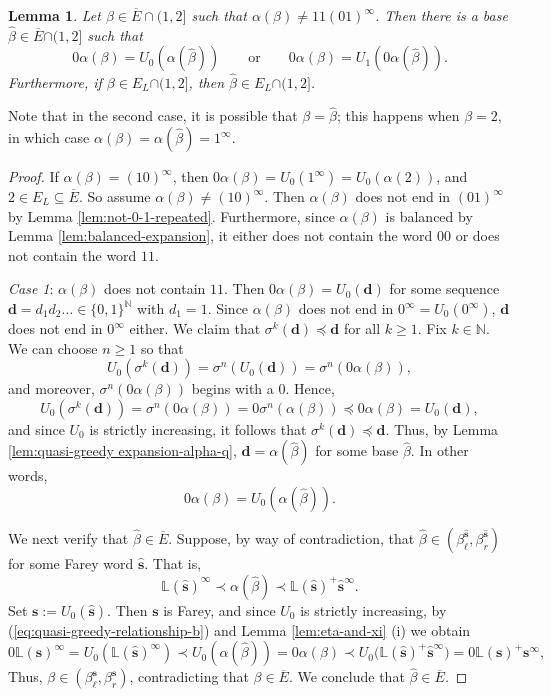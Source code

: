 \documentclass[11pt]{amsart}
\newtheorem{lemma}[theorem]{Lemma}
\theoremstyle{definition}
\theoremstyle{remark}
\numberwithin{equation}{section}
\newcommand{\N}{\ensuremath{\mathbb{N}}}
\renewcommand{\L}{\ensuremath{\mathbb{L}}}
\newcommand{\s}{ {\mathbf{s}}}
\newcommand{\f}{\infty}
\newcommand{\al}{\alpha}
\newcommand{\lle}{\preccurlyeq}
\newcommand{\si}{\sigma}
\begin{document}
\begin{lemma} \label{lem:alpha-renormalizing}
{
Let $\beta\in \overline{E}\cap(1,2]$ such that $\al(\beta)\neq 11(01)^\f$. Then there is a base $\hat{\beta}\in \overline{E}{\cap(1,2]}$ such that
\[
0\al(\beta)=U_0(\al(\hat{\beta})) \qquad \mbox{or} \qquad 0\al(\beta)=U_1(0\al(\hat{\beta})).
\]
Furthermore, if $\beta\in E_L{\cap(1,2]}$, then $\hat{\beta}\in E_L{\cap(1,2]}$.
}
\end{lemma}

Note that in the second case, it is possible that $\beta=\hat{\beta}$; this happens when $\beta=2$, in which case $\al(\beta)=\al(\hat{\beta})=1^\f$.

\begin{proof}
If $\al(\beta)=(10)^\f$, then $0\al(\beta)=U_0(1^\f)=U_0(\al(2))$, and $2\in E_L\subseteq \overline{E}$. So assume $\al(\beta)\neq(10)^\f$. Then $\al(\beta)$ does not end in $(01)^\f$ by Lemma \ref{lem:not-0-1-repeated}.
Furthermore, since $\al(\beta)$ is balanced by Lemma \ref{lem:balanced-expansion}, it either does not contain the word $00$ or does not contain the word $11$.

\medskip
{\em Case 1}: $\al(\beta)$ does not contain $11$. Then $0\alpha(\beta)=U_0(\mathbf{d})$ for some sequence $\mathbf{d}=d_1d_2\dots\in\{0,1\}^\N$ with $d_1=1$. Since $\al(\beta)$ does not end in $0^\f=U_0(0^\f)$, $\mathbf{d}$ does not end in $0^\f$ either. We claim that $\si^k(\mathbf{d})\lle \mathbf{d}$ for all $k\geq 1$. Fix $k\in\N$. We can choose $n\geq 1$ so that
\[
U_0(\si^k(\mathbf{d}))=\si^n(U_0(\mathbf{d}))=\si^n(0\alpha(\beta)),
\]
and moreover, $\si^{n}(0\alpha(\beta))$ begins with a $0$. Hence,
\[
U_0(\si^k(\mathbf{d}))=\si^{n}(0\alpha(\beta))=0\si^n(\al(\beta))\lle 0\alpha(\beta)=U_0(\mathbf{d}),
\]
and since $U_0$ is strictly increasing, it follows that $\si^k(\mathbf{d})\lle \mathbf{d}$. Thus, by Lemma \ref{lem:quasi-greedy expansion-alpha-q}, $\mathbf{d}=\alpha(\hat{\beta})$ for some base $\hat{\beta}$. In other words,
\begin{equation} \label{eq:quasi-greedy-relationship-b}
0\alpha(\beta)=U_0(\alpha(\hat{\beta})).
\end{equation}

We next verify that $\hat{\beta}\in \overline{E}$. Suppose, by way of contradiction, that $\hat{\beta}\in (\beta_\ell^{\hat{\s}},\beta_r^{\hat{\s}})$ for some Farey word $\hat{\s}$. That is,
\begin{equation} \label{eq:in-Farey-interval}
\L(\hat{\s})^\f\prec \alpha(\hat{\beta}) \prec \L(\hat{\s})^+\hat{\s}^\f.
\end{equation}
Set $\s:=U_0(\hat{\s})$. Then $\s$ is Farey, and since $U_0$ is strictly increasing, by (\ref{eq:quasi-greedy-relationship-b}) and Lemma \ref{lem:eta-and-xi} (i) we obtain
\[
0\L(\s)^\f=U_0(\L(\hat{\s})^\f)\prec U_0(\alpha(\hat{\beta}))=0\alpha(\beta)\prec U_0\big(\L(\hat{\s})^+\hat{\s}^\f\big)=0\L(\s)^+\s^\f,
\]
Thus, $\beta\in(\beta_\ell^{\s},\beta_r^{\s})$, contradicting that $\beta\in \overline{E}$. We conclude that $\hat{\beta}\in \overline{E}$.


\end{proof}
\end{document}
